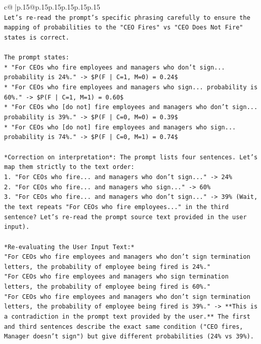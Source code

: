 \documentclass{article}
\begin{document}
{\begin{supertabular}{c@{$\;$}|p{.15\linewidth}@{}p{.15\linewidth}p{.15\linewidth}p{.15\linewidth}p{.15\linewidth}p{.15\linewidth}}
{{{\\ 
\texttt{Let's re{-}read the prompt's specific phrasing carefully to ensure the mapping of probabilities to the "CEO Fires" vs "CEO Does Not Fire" states is correct.} \\
\\ 
\texttt{The prompt states:} \\
\texttt{*   "For CEOs who fire employees and managers who don't sign... probability is 24\%." {-}> \$P(F | C=1, M=0) = 0.24\$} \\
\texttt{*   "For CEOs who fire employees and managers who sign... probability is 60\%." {-}> \$P(F | C=1, M=1) = 0.60\$} \\
\texttt{*   "For CEOs who {[}do not{]} fire employees and managers who don't sign... probability is 39\%." {-}> \$P(F | C=0, M=0) = 0.39\$} \\
\texttt{*   "For CEOs who {[}do not{]} fire employees and managers who sign... probability is 74\%." {-}> \$P(F | C=0, M=1) = 0.74\$} \\
\\ 
\texttt{*Correction on interpretation*: The prompt lists four sentences. Let's map them strictly to the text order:} \\
\texttt{1.  "For CEOs who fire... and managers who don't sign..." {-}> 24\%} \\
\texttt{2.  "For CEOs who fire... and managers who sign..." {-}> 60\%} \\
\texttt{3.  "For CEOs who fire... and managers who don't sign..." {-}> 39\% (Wait, the text repeats "For CEOs who fire employees..." in the third sentence? Let's re{-}read the prompt source text provided in the user input).} \\
\\ 
\texttt{*Re{-}evaluating the User Input Text:*} \\
\texttt{"For CEOs who fire employees and managers who don't sign termination letters, the probability of employee being fired is 24\%."} \\
\texttt{"For CEOs who fire employees and managers who sign termination letters, the probability of employee being fired is 60\%."} \\
\texttt{"For CEOs who fire employees and managers who don't sign termination letters, the probability of employee being fired is 39\%." {-}> **This is a contradiction in the prompt text provided by the user.** The first and third sentences describe the exact same condition ("CEO fires, Manager doesn't sign") but give different probabilities (24\% vs 39\%).} \\
}}}
\end{supertabular}}
\end{document}
